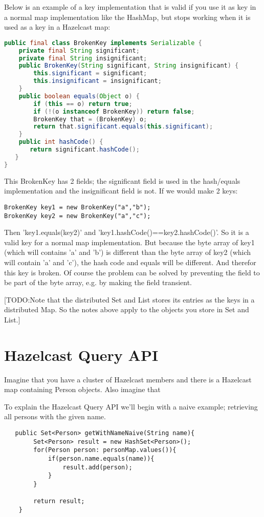 Below is an example of a key implementation that is valid if you use it as key in a normal map implementation like the HashMap, but stops working when it is used as a key in a Hazelcast map:
\begin{lstlisting}[language=java]
public final class BrokenKey implements Serializable {
    private final String significant;
    private final String insignificant;
    public BrokenKey(String significant, String insignificant) {
        this.significant = significant;
        this.insignificant = insignificant;
    }
    public boolean equals(Object o) {
        if (this == o) return true;
        if (!(o instanceof BrokenKey)) return false;
        BrokenKey that = (BrokenKey) o;
        return that.significant.equals(this.significant);
    }
    public int hashCode() {
       return significant.hashCode();
   }
}
\end{lstlisting}
This BrokenKey has 2 fields; the significant field is used in the hash/equals implementation and the insignificant field is not. If we would make 2 keys:
\begin{lstlisting}
BrokenKey key1 = new BrokenKey("a","b");
BrokenKey key2 = new BrokenKey("a","c");
\end{lstlisting} 
Then 'key1.equals(key2)' and 'key1.hashCode()==key2.hashCode()'. So it is a valid key for a normal map implementation. But because the byte array of key1 (which will contains 'a' and 'b') is different than the byte array of key2 (which will contain 'a' and 'c'), the hash code and equals will be different. And therefor this key is broken. Of course the problem can be solved by preventing the field to be part of the byte array, e.g. by making the field transient.

[TODO:Note that the distributed Set and List stores its entries as the keys in a distributed Map. So the notes above apply to the objects you store in Set and List.]

\section{Hazelcast Query API}
Imagine that you have a cluster of Hazelcast members and there is a Hazelcast map containing Person objects. Also imagine that  

To explain the Hazelcast Query API we'll begin with a naive example; retrieving all persons with the given name.

\begin{verbatim}
   public Set<Person> getWithNameNaive(String name){
        Set<Person> result = new HashSet<Person>();
        for(Person person: personMap.values()){
            if(person.name.equals(name)){
                result.add(person);
            }
        }

        return result;
    }
\end{verbatim}

